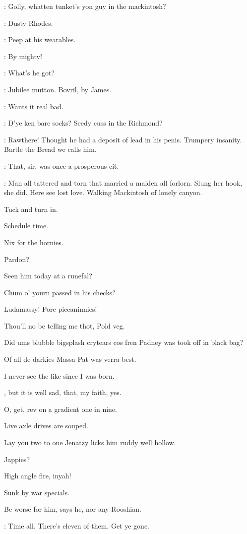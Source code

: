 
\crotthers:
Golly,
whatten tunket's yon guy in the mackintosh?

\lenehan:
Dusty Rhodes.

\lynch:
Peep at his wearables.

\crotthers:
By mighty!

\stephen:
What's he got?

\dixon:
Jubilee mutton.
Bovril,
by James.

\lenehan:
Wants it real bad.

\crotthers:
D'ye ken bare socks?
Seedy cuss in the Richmond?

\dixon:
Rawthere!
Thought he had a deposit of lead in his penis.
Trumpery insanity.
Bartle the Bread we calls him.

\lynch:
That,
sir,
was once a prosperous cit.

\Bloom:
Man all tattered and torn that married a maiden all forlorn.
Slung her hook,
she did.
Here see lost love.
Walking Mackintosh of lonely canyon.

Tuck and turn in.

Schedule time.

Nix for the hornies.

Pardon?

Seen him today at a runefal?

Chum o' yourn passed in his checks?

Ludamassy!
Pore piccaninnies!

Thou'll no be telling me thot,
Pold veg.

Did ums blubble bigsplash crytears cos fren Padney
was took off in black bag?

Of all de darkies Massa Pat was verra best.

I never see the like since I was born.

,
but it is well sad,
that,
my faith,
yes.

O,
get,
rev on a gradient one in nine.

Live axle drives are souped.

Lay you two to one Jenatzy licks him ruddy well hollow.

Jappies?

High angle fire,
inyah!

Sunk by war specials.

Be worse for him,
says he,
nor any Rooshian.

\barman:
Time all.
There's eleven of them.
Get ye gone.

